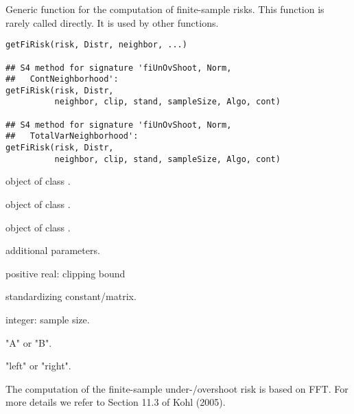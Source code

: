 \begin{Description}\relax
Generic function for the computation of finite-sample risks.
This function is rarely called directly. It is used by 
other functions.
\end{Description}
\begin{Usage}
\begin{verbatim}
getFiRisk(risk, Distr, neighbor, ...)

## S4 method for signature 'fiUnOvShoot, Norm,
##   ContNeighborhood':
getFiRisk(risk, Distr, 
          neighbor, clip, stand, sampleSize, Algo, cont)

## S4 method for signature 'fiUnOvShoot, Norm,
##   TotalVarNeighborhood':
getFiRisk(risk, Distr, 
          neighbor, clip, stand, sampleSize, Algo, cont)
\end{verbatim}
\end{Usage}
\begin{Arguments}
\begin{ldescription}
\item[\code{risk}] object of class . 
\item[\code{Distr}] object of class . 
\item[\code{neighbor}] object of class . 
\item[\code{...}] additional parameters. 
\item[\code{clip}] positive real: clipping bound 
\item[\code{stand}] standardizing constant/matrix. 
\item[\code{sampleSize}] integer: sample size. 
\item[\code{Algo}] "A" or "B". 
\item[\code{cont}] "left" or "right". 
\end{ldescription}
\end{Arguments}
\begin{Details}\relax
The computation of the finite-sample under-/overshoot risk
is based on FFT. For more details we refer to Section 11.3 of Kohl (2005).
\end{Details}
